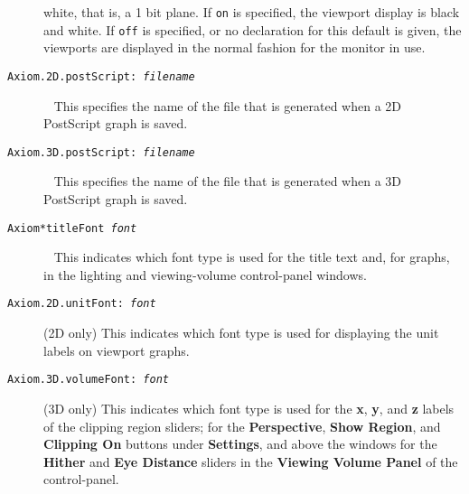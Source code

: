 \begin{description}
white, that is, a 1 bit plane.
If {\tt on} is specified, the viewport display is black and white.
If {\tt off} is specified, or no declaration for this default is
given, the viewports are displayed in the normal fashion for the
monitor in use.
%
\item[{\tt Axiom.2D.postScript:\ \it filename}] \ \newline
This specifies
the name of the file that is generated when a 2D PostScript graph
is saved.
%
\item[{\tt Axiom.3D.postScript:\ \it filename}] \ \newline
This specifies
the name of the file that is generated when a 3D PostScript graph
is saved.
%
\item[{\tt Axiom*titleFont \it font}] \ \newline
This
indicates which font type is used
for the title text and, for \threedim{} graphs,
in the lighting and viewing-volume control-panel windows.
%
\item[{\tt Axiom.2D.unitFont:\ \it font}] \quad (2D only) \newline
This indicates
which font type is used for displaying the unit labels on
\twodim{} viewport graphs.
%
\item[{\tt Axiom.3D.volumeFont:\ \it font}] \quad (3D only) \newline
This indicates which font type is used for the {\bf x},
{\bf y}, and {\bf z} labels of the clipping region sliders; for the
{\bf Perspective}, {\bf Show Region}, and {\bf Clipping On} buttons under
{\bf Settings}, and above the windows for the {\bf Hither} and
{\bf Eye Distance} sliders in the {\bf Viewing Volume Panel} of the
\threedim{} control-panel.
\end{description}
